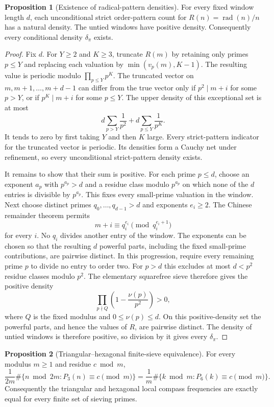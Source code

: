 \documentclass[11pt]{article}
\theoremstyle{definition}
\newtheorem{proposition}{Proposition}
\begin{document}
\begin{proposition}[Existence of radical-pattern densities]\label{w:raddens}
For every fixed window length $d$, each unconditional strict order-pattern count for $R(n)=\operatorname{rad}(n)/n$ has a natural density.  The untied windows have positive density.  Consequently every conditional density $\delta_\pi$ exists.
\end{proposition}

\begin{proof}
Fix $d$.  For $Y\ge2$ and $K\ge3$, truncate $R(m)$ by retaining only primes $p\le Y$ and replacing each valuation by $\min(v_p(m),K-1)$.  The resulting value is periodic modulo $\prod_{p\le Y}p^K$.  The truncated vector on $m,m+1,\ldots,m+d-1$ can differ from the true vector only if $p^2\mid m+i$ for some $p>Y$, or if $p^K\mid m+i$ for some $p\le Y$.  The upper density of this exceptional set is at most
\[
d\sum_{p>Y}\frac1{p^2}+d\sum_{p\le Y}\frac1{p^K}.
\]
It tends to zero by first taking $Y$ and then $K$ large.  Every strict-pattern indicator for the truncated vector is periodic.  Its densities form a Cauchy net under refinement, so every unconditional strict-pattern density exists.

It remains to show that their sum is positive.  For each prime $p\le d$, choose an exponent $a_p$ with $p^{a_p}>d$ and a residue class modulo $p^{a_p}$ on which none of the $d$ entries is divisible by $p^{a_p}$.  This fixes every small-prime valuation in the window.  Next choose distinct primes $q_0,\ldots,q_{d-1}>d$ and exponents $e_i\ge2$.  The Chinese remainder theorem permits
\[
m+i\equiv q_i^{e_i}\pmod {q_i^{e_i+1}}
\]
for every $i$.  No $q_i$ divides another entry of the window.  The exponents can be chosen so that the resulting $d$ powerful parts, including the fixed small-prime contributions, are pairwise distinct.  In this progression, require every remaining prime $p$ to divide no entry to order two.  For $p>d$ this excludes at most $d<p^2$ residue classes modulo $p^2$.  The elementary squarefree sieve therefore gives the positive density
\[
\prod_{p\nmid Q}\left(1-\frac{\nu(p)}{p^2}\right)>0,
\]
where $Q$ is the fixed modulus and $0\le\nu(p)\le d$.  On this positive-density set the powerful parts, and hence the values of $R$, are pairwise distinct.  The density of untied windows is therefore positive, so division by it gives every $\delta_\pi$.
\end{proof}

\begin{proposition}[Triangular--hexagonal finite-sieve equivalence]\label{w:trihex}
For every modulus $m\ge1$ and residue $c\bmod m$,
\[
\frac{1}{2m}\#\{n\bmod 2m:P_3(n)\equiv c\pmod m\}
=\frac{1}{m}\#\{k\bmod m:P_6(k)\equiv c\pmod m\}.
\]
Consequently the triangular and hexagonal local compass frequencies are exactly equal for every finite set of sieving primes.
\end{proposition}
\end{document}
